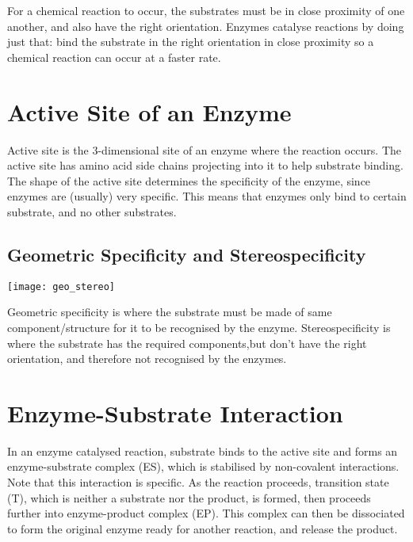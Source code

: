 \documentclass[a4paper, 12pt]{report}
\begin{document}
For a chemical reaction to occur, the substrates must be in close proximity of one another, and also have the right orientation.
Enzymes catalyse reactions by doing just that: bind the substrate in the right orientation in close proximity so a chemical reaction can occur at a faster rate.

\section{Active Site of an Enzyme}

Active site is the 3-dimensional site of an enzyme where the reaction occurs.
The active site has amino acid side chains projecting into it to help substrate binding.
The shape of the active site determines the specificity of the enzyme, since enzymes are (usually) very specific.
This means that enzymes only bind to certain substrate, and no other substrates.

\subsection{Geometric Specificity and Stereospecificity}

\begin{center}
\texttt{[image: geo\_stereo]}
\end{center}
Geometric specificity is where the substrate must be made of same component/structure for it to be recognised by the enzyme.
Stereospecificity is where the substrate has the required components,but don't have the right orientation, and therefore not recognised by the enzymes.

\section{Enzyme-Substrate Interaction}

\begin{center}
\end{center}

In an enzyme catalysed reaction, substrate binds to the active site and forms an enzyme-substrate complex (ES), which is stabilised by non-covalent interactions.
Note that this interaction is specific.
As the reaction proceeds, transition state (T), which is neither a substrate nor the product, is formed, then proceeds further into enzyme-product complex (EP).
This complex can then be dissociated to form the original enzyme ready for another reaction, and release the product.
\end{document}
